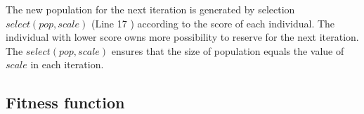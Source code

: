 \documentclass[10pt,journal]{IEEEtran}
\newcommand{\calS}{\mathcal{S}}
\theoremstyle{remark}
\begin{document}
The new population for the next iteration is generated by selection $select(pop,scale)$ (Line 17  ) according to the score of each individual.
The individual with lower score owns more possibility to reserve for the next iteration.
The $select(pop,scale)$ ensures that the size of population equals the value of $scale$ in each iteration.



\subsection{Fitness function \label{s:fit}}
\end{document}
